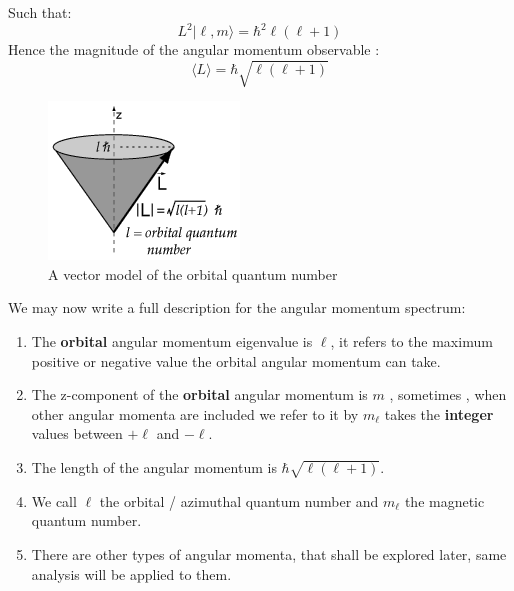 Such that:
\begin{equation}
L^2 | \ell, m\rangle = \hbar^ 2 \ell(\ell+1)
\end{equation}
Hence the magnitude of the angular momentum observable :
\begin{equation}
\langle L\rangle = \hbar\sqrt{\ell ( \ell+1)} 
\end{equation}
\begin{figure}[h!]
	\centering
	\includegraphics[scale=1]{./figures/z2}
	\caption{A vector model of the orbital quantum number  } 
\end{figure}
We may now write a full description for the angular momentum spectrum:
\begin{enumerate}
	\item The \textbf{orbital} angular momentum eigenvalue is $ \ell$, it refers to the maximum positive or negative value the orbital angular momentum can take.
	\item The z-component of the \textbf{orbital} angular momentum is $ m$ , sometimes , when other angular momenta are included we refer to it by $ m_\ell$ takes the \textbf{integer} values between $+ \ell$ and $ -\ell$.
	\item The length of the angular momentum is $ \hbar \sqrt{\ell(\ell+1)}$.
	\item We call $ \ell$ the orbital / azimuthal quantum number and $ m_\ell$ the magnetic quantum number. 
	\item There are other types of angular momenta, that shall be explored later, same analysis will be applied to them.
\end{enumerate}
